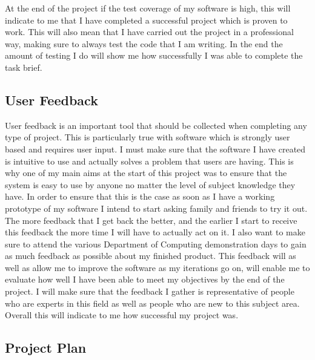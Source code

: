 At the end of the project if the test coverage of my software is high, this will indicate to me that I have completed a successful project which is proven to work. This will also mean that I have carried out the project in a professional way, making sure to always test the code that I am writing. In the end the amount of testing I do will show me how successfully I was able to complete the task brief.

\subsection{User Feedback}

User feedback is an important tool that should be collected when completing any type of project. This is particularly true with software which is strongly user based and requires user input. I must make sure that the software I have created is intuitive to use and actually solves a problem that users are having. This is why one of my main aims at the start of this project was to ensure that the system is easy to use by anyone no matter the level of subject knowledge they have. In order to ensure that this is the case as soon as I have a working prototype of my software I intend to start asking family and friends to try it out. The more feedback that I get back the better, and the earlier I start to receive this feedback the more time I will have to actually act on it. I also want to make sure to attend the various Department of Computing demonstration days to gain as much feedback as possible about my finished product. This feedback will as well as allow me to improve the software as my iterations go on, will enable me to evaluate how well I have been able to meet my objectives by the end of the project. I will make sure that the feedback I gather is representative of people who are experts in this field as well as people who are new to this subject area. Overall this will indicate to me how successful my project was.

\subsection{Project Plan}

